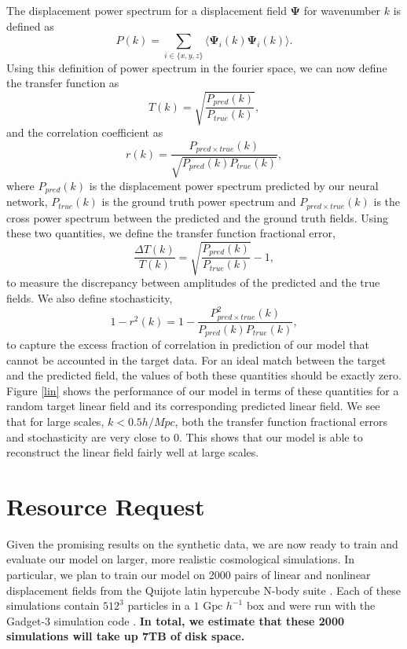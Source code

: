 \documentclass[10pt]{article}
\begin{document}
The displacement power spectrum for a displacement field $\mathbf{\Psi}$ for wavenumber $k$ is defined as
$$
P(k) = \sum_{i \in \{x,y,z\}}\langle\mathbf{\Psi}_i(k)\mathbf{\Psi}_i(k)\rangle.
$$
Using this definition of power spectrum in the fourier space, we can now define the transfer function as
$$
T(k) = \sqrt{\frac{P_{pred}(k)}{P_{true}(k)}},
$$
and the correlation coefficient as
$$
r(k) = \frac{P_{pred \times true}(k)}{\sqrt{P_{pred}(k)P_{true}(k)}},
$$
where $P_{pred}(k)$ is the displacement power spectrum predicted by our neural network, $P_{true}(k)$ is the ground truth power spectrum and $P_{pred \times true}(k)$ is the cross power spectrum between the predicted and the ground truth fields. Using these two quantities, we define the transfer function fractional error,
$$
\frac{\Delta T(k)}{T(k)} = \sqrt{\frac{P_{pred}(k)}{P_{true}(k)}}-1,
$$
to measure the discrepancy between amplitudes of the predicted and the true fields. We also define stochasticity,
$$
1 - r^2(k) = 1 - \frac{P^2_{pred \times true}(k)}{{P_{pred}(k)P_{true}(k)}},
$$
to capture the excess fraction of correlation in prediction of our model that cannot be accounted in the target data. For an ideal match between the target and the predicted field, the values of both these quantities should be exactly zero. Figure \ref{lin} shows the performance of our model in terms of these quantities for a random target linear field and its corresponding predicted linear field. We see that for large scales, $k < 0.5 h/Mpc$, both the transfer function fractional errors and stochasticity are very close to $0$. This shows that our model is able to reconstruct the linear field fairly well at large scales.

\section{Resource Request}

Given the promising results on the synthetic data, we are now ready to train and evaluate our model on larger, more realistic cosmological simulations. In particular, we plan to train our model on 2000 pairs of linear and nonlinear displacement fields from the Quijote latin hypercube N-body suite \cite{quijote}. Each of these simulations contain $512^3$ particles in a $1 \text{ Gpc } h^{-1}$ box and were run with the Gadget-3 simulation code \cite{gadget-3}. \textbf{In total, we estimate that these 2000 simulations will take up 7TB of disk space.}
\end{document}
